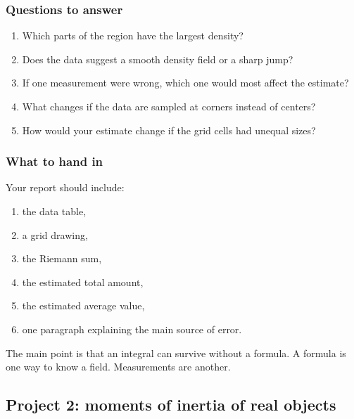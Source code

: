 \subsubsection*{Questions to answer}

\begin{enumerate}
\item Which parts of the region have the largest density?

\item Does the data suggest a smooth density field or a sharp jump?

\item If one measurement were wrong, which one would most affect the estimate?

\item What changes if the data are sampled at corners instead of centers?

\item How would your estimate change if the grid cells had unequal sizes?
\end{enumerate}

\subsubsection*{What to hand in}

Your report should include:

\begin{enumerate}
\item the data table,

\item a grid drawing,

\item the Riemann sum,

\item the estimated total amount,

\item the estimated average value,

\item one paragraph explaining the main source of error.
\end{enumerate}

The main point is that an integral can survive without a formula.  A formula is one way
to know a field.  Measurements are another.

\subsection{Project 2: moments of inertia of real objects}


